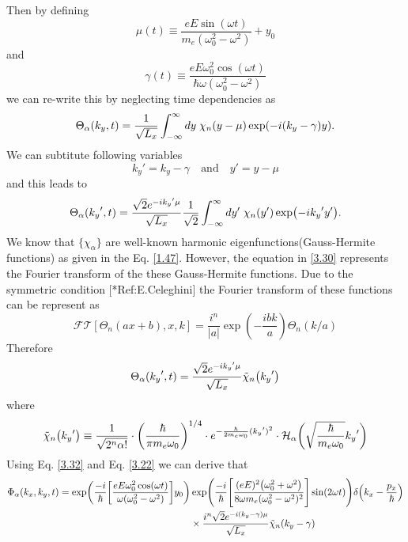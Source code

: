 Then by defining
\begin{equation} \label{3.26}
  \mu(t) \equiv \frac{eE\sin(\omega t)}{m_e(\omega_0^2 - \omega^2)} + y_0
\end{equation}
and
\begin{equation} \label{3.27}
  \gamma(t) \equiv
  \frac{eE\omega_0^2\cos(\omega t)}{\hbar\omega(\omega_0^2 - \omega^2)}
\end{equation}
we can re-write this by neglecting time dependencies as
\begin{equation} \label{3.28}
  \Theta_{\alpha}(k_y,t) =
  \frac{1}{\sqrt{L_x}}
  \int_{-\infty}^{\infty} dy\;
  \chi_{n}\qty(y - \mu )
  \exp(
    -i\qty(k_y - \gamma)
    y).
\end{equation}
We can subtitute following variables
\begin{equation} \label{3.29}
  {k_y}' = k_y -\gamma \quad \text{and} \quad y' = y -\mu
\end{equation}
and this leads to
\begin{equation} \label{3.30}
  \Theta_{\alpha}({k_y}' ,t) =
  \frac{\sqrt{2}e^{-i {k_y}'\mu}}{\sqrt{L_x}}
  \frac{1}{\sqrt{2}}
  \int_{-\infty}^{\infty} dy'\;
  \chi_{n}\qty(y')
  \exp(-i{k_y}' y').
\end{equation}
We know that $\{\chi_{\alpha}\}$ are well-known harmonic eigenfunctions(Gauss-Hermite functions) as given in the Eq. \eqref{1.47}. However, the equation in \eqref{3.30} represents the Fourier transform of the these Gauss-Hermite functions. Due to the symmetric condition [*Ref:E.Celeghini] the Fourier transform of these functions can be represent as
\begin{equation} \label{3.31}
  \mathcal{FT}[\Theta_n(ax+b),x,k] = \frac{i^n}{|a|}\exp(-\frac{ibk}{a})\Theta_n(k/a)
\end{equation}
Therefore
\begin{equation} \label{3.32}
  \Theta_{\alpha}({k_y}' ,t) =
  \frac{\sqrt{2}e^{-i {k_y}'\mu}}{\sqrt{L_x}}
  \tilde{\chi}_{n}\qty({k_y}')
\end{equation}
where
\begin{equation} \label{3.33}
  \tilde{\chi}_{n}\qty({k_y}') \equiv
  \frac{1}{\sqrt{2^{n}{\alpha}!}}  \cdot
  \bigg(\frac{\hbar}{\pi m_e\omega_0}\bigg)^{1/4}
  \cdot e^{-\frac{\hbar}{2 m_e\omega_0 } ({k_y}')^2} \cdot
  \mathcal{H}_{\alpha} \bigg(\sqrt{\frac{\hbar}{m_e \omega_0}}{k_y}'\bigg)
\end{equation}
Using Eq. \eqref{3.32} and Eq. \eqref{3.22} we can derive that
\begin{equation} \label{3.34}
  \begin{aligned}
    \Phi_{\alpha}(k_x,k_y,t)  =
    \exp(
      \frac{-i}{\hbar}
      \qty[
      \frac{eE\omega_0^2\cos(\omega t)}{\omega(\omega_0^2 - \omega^2)}]y_0
    )&
    \exp(
      \frac{-i}{\hbar}
      \qty[
      \frac{(eE)^2\qty(\omega_0^2 + \omega^2)}{8\omega m_e(\omega_0^2 - \omega^2)^2}
      ]\sin(2\omega t)
    )
    \delta\qty(k_x -\frac{p_x}{\hbar})
    \\
    & \times
    \frac{i^n\sqrt{2}e^{-i \qty(k_y -\gamma)\mu}}{\sqrt{L_x}}
    \tilde{\chi}_{n}\qty(k_y -\gamma)
  \end{aligned}
\end{equation}
